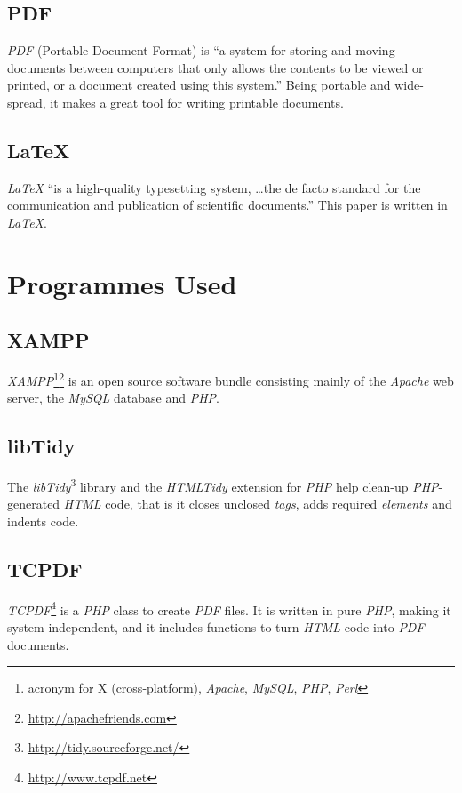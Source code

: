 \documentclass[12pt,a4paper,twoside,openany]{report}
\begin{document}
\subsection{PDF}
\label{pdf}
\textit{PDF} (Portable Document Format) is ``a system for storing and moving documents
between computers that only allows the contents to be viewed or printed, or a
document created using this system.''\cite{pdf} Being portable and wide-spread,
it makes a great tool for writing printable documents.

\subsection{\LaTeX{}}
\label{latex}
\textit{\LaTeX{}} ``is a high-quality typesetting system, \ldots the de facto standard
for the communication and publication of scientific documents.''\cite{latex}
This paper is written in \textit{\LaTeX{}}.

\section{Programmes Used}
\subsection{XAMPP}
\label{xampp}
\textit{XAMPP}\footnote{acronym for X (cross-platform), \textit{Apache},
\textit{MySQL}, \textit{PHP},
\textit{Perl}}\footnote{\url{http://apachefriends.com}} is an open source
software bundle consisting mainly of the \textit{Apache} web server, the
\textit{MySQL} database and \textit{PHP}.

\subsection{libTidy}
\label{tidy}
The \textit{libTidy}\footnote{\url{http://tidy.sourceforge.net/}} library and
the \textit{HTMLTidy} extension for \textit{PHP} help clean-up
\textit{PHP}-generated \textit{HTML} code, that is it closes unclosed
\textit{tags}, adds required \textit{elements} and indents code.

\subsection{TCPDF}
\label{tcpdf}
\textit{TCPDF}\footnote{\url{http://www.tcpdf.net}} is a \textit{PHP} class to
create \textit{PDF} files. It is written in pure \textit{PHP}, making it
system-independent, and it includes functions to turn \textit{HTML} code into
\textit{PDF} documents.
\end{document}
